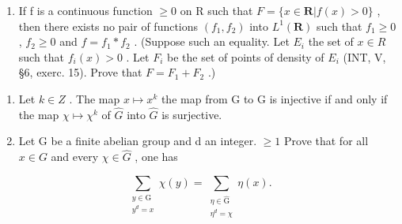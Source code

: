 \begin{enumerate}
\def\labelenumi{\alph{enumi})}
\setcounter{enumi}{3}
\tightlist
\item
  If f is a continuous function \(\geqslant 0\) on R such that \(F = \{x \in \mathbf{R} | f(x) > 0\}\) , then there exists no pair of functions \((f_{1}, f_{2})\) into \(L^{1}(\mathbf{R})\) such that \(f_{1} \geqslant 0\) , \(f_{2} \geqslant 0\) and \(f = f_{1} * f_{2}\) . (Suppose such an equality. Let \(E_{i}\) the set of \(x \in R\) such that \(f_{i}(x) > 0\) . Let \(F_{i}\) be the set of points of density of \(E_{i}\) (INT, V, §6, exerc. 15). Prove that \(F = F_{1} + F_{2}\) .)
\end{enumerate}

\begin{enumerate}
\def\labelenumi{\arabic{enumi})}
\setcounter{enumi}{9}
\item
  Let \(k \in Z\) . The map \(x \mapsto x^{k}\) the map from G to G is injective if and only if the map \(\chi \mapsto \chi^{k}\) of \(\widehat{G}\) into \(\widehat{G}\) is surjective.
\item
  Let G be a finite abelian group and d an integer. \(\geqslant 1\) Prove that for all \(x \in G\) and every \(\chi \in \widehat{G}\) , one has
\end{enumerate}

\[
\sum_{\substack{y\in \mathrm{G}\\ y^{d} = x}}\chi (y) = \sum_{\substack{\eta \in \widehat{\mathrm{G}}\\ \eta^{d} = \chi}}\eta (x).
\]


